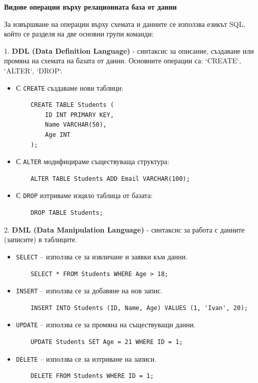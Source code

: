 \documentclass{article}
\renewcommand{\\}{\newline}
\begin{document}
\textbf{Видове операции върху релационната база от данни}

За извършване на операции върху схемата и данните се използва езикът SQL, който се разделя на две основни групи команди:

1. \textbf{DDL (Data Definition Language)} - синтаксис за описание, създаване или промяна на схемата на базата от данни. Основните операции са: `CREATE`, `ALTER`, `DROP`.
\begin{itemize}
  \item С \texttt{CREATE} създаваме нови таблици: 
    \begin{lstlisting}
    CREATE TABLE Students (
        ID INT PRIMARY KEY,
        Name VARCHAR(50),
        Age INT
    );
    \end{lstlisting}
  \item С \texttt{ALTER} модифицираме съществуваща структура:
    \begin{lstlisting}
    ALTER TABLE Students ADD Email VARCHAR(100);
    \end{lstlisting}
  \item С \texttt{DROP} изтриваме изцяло таблица от базата:
    \begin{lstlisting}
    DROP TABLE Students;
    \end{lstlisting}
\end{itemize}

2. \textbf{DML (Data Manipulation Language)} - синтаксис за работа с данните (записите) в таблиците.
\begin{itemize}
    \item \texttt{SELECT} -- използва се за извличане и заявки към данни.
    \begin{lstlisting}
    SELECT * FROM Students WHERE Age > 18;
    \end{lstlisting}
    \item \texttt{INSERT} -- използва се за добавяне на нов запис.
    \begin{lstlisting}
    INSERT INTO Students (ID, Name, Age) VALUES (1, 'Ivan', 20);
    \end{lstlisting}
    \item \texttt{UPDATE} -- използва се за промяна на съществуващи данни.
    \begin{lstlisting}
    UPDATE Students SET Age = 21 WHERE ID = 1;
    \end{lstlisting}
    \item \texttt{DELETE} -- използва се за изтриване на записи.
    \begin{lstlisting}
    DELETE FROM Students WHERE ID = 1;
    \end{lstlisting}
\end{itemize}
\end{document}
